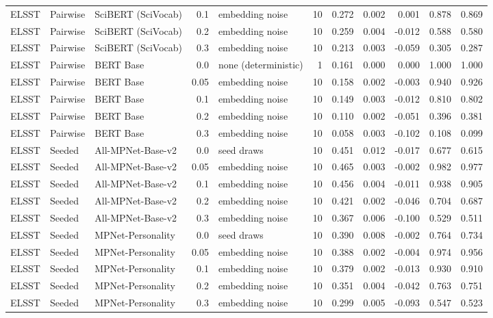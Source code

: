 \begin{table}[ht]
\begin{tabular}{lllrlrrrrrr}
ELSST & Pairwise & SciBERT (SciVocab) & 0.1 & embedding noise & 10 & 0.272 & 0.002 & 0.001 & 0.878 & 0.869 \\
ELSST & Pairwise & SciBERT (SciVocab) & 0.2 & embedding noise & 10 & 0.259 & 0.004 & -0.012 & 0.588 & 0.580 \\
ELSST & Pairwise & SciBERT (SciVocab) & 0.3 & embedding noise & 10 & 0.213 & 0.003 & -0.059 & 0.305 & 0.287 \\
ELSST & Pairwise & BERT Base & 0.0 & none (deterministic) & 1 & 0.161 & 0.000 & 0.000 & 1.000 & 1.000 \\
ELSST & Pairwise & BERT Base & 0.05 & embedding noise & 10 & 0.158 & 0.002 & -0.003 & 0.940 & 0.926 \\
ELSST & Pairwise & BERT Base & 0.1 & embedding noise & 10 & 0.149 & 0.003 & -0.012 & 0.810 & 0.802 \\
ELSST & Pairwise & BERT Base & 0.2 & embedding noise & 10 & 0.110 & 0.002 & -0.051 & 0.396 & 0.381 \\
ELSST & Pairwise & BERT Base & 0.3 & embedding noise & 10 & 0.058 & 0.003 & -0.102 & 0.108 & 0.099 \\
ELSST & Seeded & All-MPNet-Base-v2 & 0.0 & seed draws & 10 & 0.451 & 0.012 & -0.017 & 0.677 & 0.615 \\
ELSST & Seeded & All-MPNet-Base-v2 & 0.05 & embedding noise & 10 & 0.465 & 0.003 & -0.002 & 0.982 & 0.977 \\
ELSST & Seeded & All-MPNet-Base-v2 & 0.1 & embedding noise & 10 & 0.456 & 0.004 & -0.011 & 0.938 & 0.905 \\
ELSST & Seeded & All-MPNet-Base-v2 & 0.2 & embedding noise & 10 & 0.421 & 0.002 & -0.046 & 0.704 & 0.687 \\
ELSST & Seeded & All-MPNet-Base-v2 & 0.3 & embedding noise & 10 & 0.367 & 0.006 & -0.100 & 0.529 & 0.511 \\
ELSST & Seeded & MPNet-Personality & 0.0 & seed draws & 10 & 0.390 & 0.008 & -0.002 & 0.764 & 0.734 \\
ELSST & Seeded & MPNet-Personality & 0.05 & embedding noise & 10 & 0.388 & 0.002 & -0.004 & 0.974 & 0.956 \\
ELSST & Seeded & MPNet-Personality & 0.1 & embedding noise & 10 & 0.379 & 0.002 & -0.013 & 0.930 & 0.910 \\
ELSST & Seeded & MPNet-Personality & 0.2 & embedding noise & 10 & 0.351 & 0.004 & -0.042 & 0.763 & 0.751 \\
ELSST & Seeded & MPNet-Personality & 0.3 & embedding noise & 10 & 0.299 & 0.005 & -0.093 & 0.547 & 0.523 \\

\end{tabular}
\end{table}
